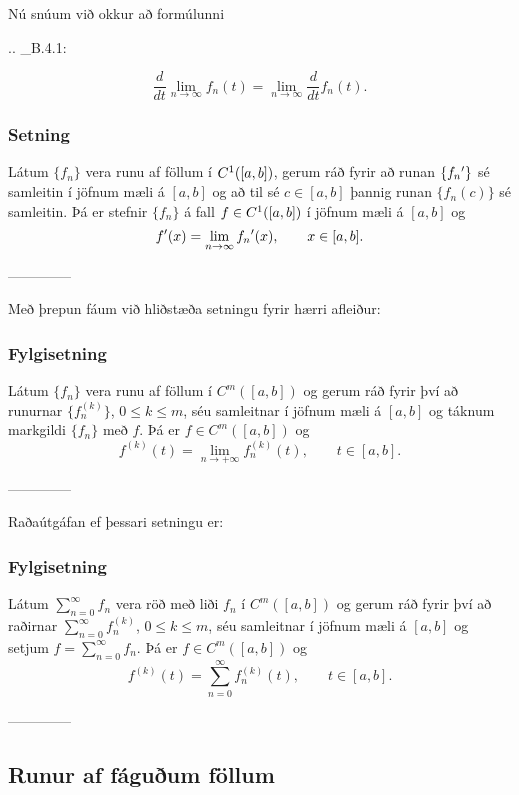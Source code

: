 Nú snúum við okkur að formúlunni

.. _B.4.1:

\begin{equation*}
\dfrac d{dt} \lim_{n\to \infty} f_n(t) =\lim_{n\to\infty}
\dfrac d{dt} f_n(t).
\end{equation*}

\subsubsection{Setning}
Látum $\{f_n\}$ vera runu af föllum í  $C\sp 1([a,b])$,
 gerum ráð fyrir að runan $\{f_n{\sp{\prime}}\}$ sé  samleitin í jöfnum mæli á
$[a,b]$ og að til sé $c\in [a,b]$ þannig runan $\{f_n(c)\}$ sé samleitin.
Þá er stefnir $\{f_n\}$ á fall $f\in C\sp 1([a,b])$ í jöfnum mæli á
$[a,b]$ og 
 $$f{\sp{\prime}}(x)=\lim_{n\to \infty}f_n{\sp{\prime}}(x), \qquad x\in [a,b].
 $$


--------------




\medskip
Með þrepun fáum við hliðstæða setningu fyrir hærri afleiður:

\subsubsection{Fylgisetning}
Látum $\{f_n\}$ vera runu af föllum í $C^m([a,b])$ og gerum
ráð fyrir því að runurnar $\{f_n^{(k)}\}$, $0\leq k\leq m$, séu
samleitnar í jöfnum mæli á $[a,b]$ og táknum markgildi $\{f_n\}$ með $f$.
Þá er $f\in C^m([a,b])$ og 
 $$f^{(k)}(t)=\lim_{n\to +\infty} f_n^{(k)}(t), \qquad t\in [a,b].
 $$


--------------



\medskip
Raðaútgáfan ef þessari setningu er:

\subsubsection{Fylgisetning}
Látum $\sum_{n=0}^\infty f_n$ vera röð með liði $f_n$ í $C^m([a,b])$ og gerum
ráð fyrir því að raðirnar  $\sum_{n=0}^\infty {f_n^{(k)}}$, $0\leq k\leq m$, séu
samleitnar í jöfnum mæli á $[a,b]$ og setjum
$f=\sum_{n=0}^\infty {f_n}$.  Þá er $f\in C^m([a,b])$ og 
 $$f^{(k)}(t)=\sum_{n=0}^{\infty} f_n^{(k)}(t), \qquad t\in [a,b].
 $$


--------------




\subsection*{Runur af fáguðum föllum}

